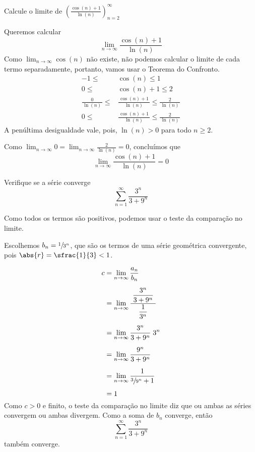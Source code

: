 \documentclass[a4paper,12pt,fleqn]{article}
\begin{document}
Calcule o limite de \(\left(\frac{\cos(n) + 1}{\ln(n)}\right)_{n=2}^\infty\)

\begin{answer}
  Queremos calcular
  \[
    \lim_{n\to\infty}\frac{\cos(n) + 1}{\ln(n)}
  \]
  Como \(\lim_{n\to\infty}\cos(n)\) não existe,
  não podemos calcular o limite de cada termo
  separadamente, portanto, vamos usar o Teorema do Confronto.
  \begin{align*}
    -1 \leq & \cos(n) \leq 1 \\[2mm]
     0 \leq & \cos(n)+1 \leq 2 \\[2mm]
     \frac{0}{\,\ln(n)\,} \leq & \frac{\,\cos(n)+1\,}{\ln(n)} \leq \frac{2}{\,\ln(n)\,} \\[2mm]
     0 \leq & \frac{\,\cos(n)+1\,}{\ln(n)} \leq \frac{2}{\,\ln(n)\,}
  \end{align*}
  A penúltima desigualdade vale, pois, \(\ln(n)>0\) para todo \(n\geq2\).

  Como \(\lim_{n\to\infty} 0 = \lim_{n\to\infty} \frac{2}{\ln(n)}=0\),
  concluímos que
  \[
    \lim_{n\to\infty}\frac{\cos(n) + 1}{\ln(n)} = 0
  \]
\end{answer}

Verifique se a série converge
\[
  \sum_{n=1}^\infty \frac{3^n}{3+9^n}
\]

\begin{answer}
  Como todos os termos são positivos, podemos usar o teste da comparação no limite.

  Escolhemos \(b_n=\sfrac{1}{3^n}\), que são os termos de uma série
  geométrica convergente, pois \(\abs{r}=\sfrac{1}{3}<1\).

  \begin{align*}
    c
    & = \lim_{n\to\infty} \frac{a_n}{b_n} \\[2mm]
    & = \lim_{n\to\infty} \frac{\;\dfrac{3^n}{3+9^n}\;}{\;\dfrac{1}{3^n}\;} \\[2mm]
    & = \lim_{n\to\infty} \frac{3^n}{3+9^n}\;3^n \\[2mm]
    & = \lim_{n\to\infty} \frac{9^n}{3+9^n} \\[2mm]
    & = \lim_{n\to\infty} \frac{1}{\sfrac{3}{9^n}+1} \\[2mm]
    & = 1
  \end{align*}
  Como \(c>0\) e finito, o teste da comparação no limite diz que ou ambas as séries
  convergem ou ambas divergem. Como a soma de \(b_n\) converge, então
  \[
    \sum_{n=1}^\infty \frac{3^n}{3+9^n}
  \]
  também converge.
\end{answer}
\end{document}
